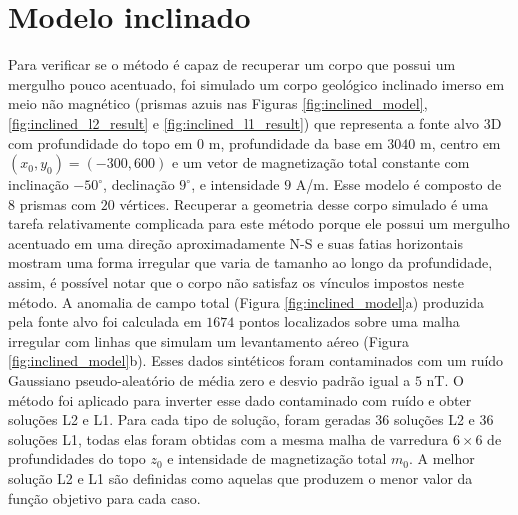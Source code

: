 \pagebreak

\section{Modelo inclinado}

Para verificar se o método é capaz de recuperar um corpo que possui um mergulho pouco acentuado, foi simulado um corpo geológico inclinado imerso em meio não magnético (prismas azuis nas Figuras 
\ref{fig:inclined_model}, \ref{fig:inclined_l2_result} e \ref{fig:inclined_l1_result})
que representa a fonte alvo 3D com profundidade do topo em $0$ m, profundidade da base em $3040$ m, centro em $ (x_0, y_0) = (-300, 600) $ e um vetor de magnetização total constante com inclinação $-50^{\circ}$, declinação $9^{\circ}$, e intensidade $9$ A/m.
Esse modelo é composto de $ 8 $ prismas com $ 20 $ vértices.
Recuperar a geometria desse corpo simulado é uma tarefa relativamente complicada para este método porque ele possui um mergulho acentuado em uma direção aproximadamente N-S e suas fatias horizontais mostram uma forma irregular que varia de tamanho ao longo da profundidade, assim, é possível notar que o corpo não satisfaz os vínculos impostos neste método.
A anomalia de campo total (Figura \ref{fig:inclined_model}a) produzida pela fonte alvo foi calculada em $1674$ pontos localizados sobre uma malha irregular com linhas que simulam um levantamento aéreo (Figura \ref{fig:inclined_model}b). Esses dados sintéticos foram contaminados com um ruído Gaussiano pseudo-aleatório de média zero e desvio padrão igual a $5$ nT.
O método foi aplicado para inverter esse dado contaminado com ruído e obter soluções L2 e L1.
Para cada tipo de solução, foram geradas $36$ soluções L2 e $36$ soluções L1, 
todas elas foram obtidas com a mesma malha de varredura $6 \times 6$ de profundidades do topo $z_{0}$ e intensidade de magnetização total $m_{0}$.
A melhor solução L2 e L1 são definidas como aquelas que produzem o menor valor da função objetivo para cada caso.

